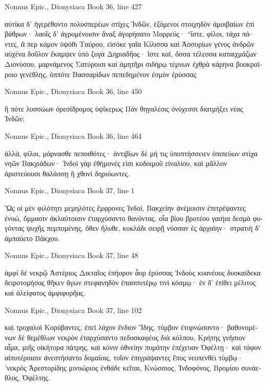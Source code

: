 \documentclass[12pt,letterpaper,twoside,final]{memoir}
\begin{document}
\begin{greek}
Nonnus Epic., Dionysiaca 
Book 36, line 427

αὐτίκα δ' ἠγερέθοντο πολυσπερέων στίχες Ἰνδῶν, 
ἑζόμενοι στοιχηδὸν ἀμοιβαίων ἐπὶ βάθρων· 
λαοῖς δ' ἀγρομένοισιν ἄναξ ἀγορήσατο Μορρεύς· 
 “ἴστε, φίλοι, τάχα πάντες, ἅ περ κάμον ὑψόθι Ταύρου, 
εἰσόκε γαῖα Κίλισσα καὶ Ἀσσυρίων γένος ἀνδρῶν 
αὐχένα δοῦλον ἔκαμψεν ὑπὸ ζυγὰ Δηριαδῆος· 
ἴστε καί, ὅσσα τέλεσσα καταιχμάζων Διονύσου, 
μαρνάμενος Σατύροισι καὶ ἀμητῆρι σιδήρῳ 
τέμνων ἐχθρὰ κάρηνα βοοκραίροιο γενέθλης, 
ὁππότε Βασσαρίδων πεπεδημένον ἐσμὸν ἐρύσσας 




Nonnus Epic., Dionysiaca 
Book 36, line 450

ἢ πότε λυσσώων ὀρεσίδρομος ὑψίκερως Πὰν 
θηγαλέοις ὀνύχεσσι διατμήξει νέας Ἰνδῶν; 



Nonnus Epic., Dionysiaca 
Book 36, line 464

ἀλλά, φίλοι, μάρνασθε πεποιθότες· ἀντιβίων δὲ 
μή τις ὑποπτήσσειεν ὀπιπεύων στίχα νηῶν 
Βακχιάδων· Ἰνδοὶ γὰρ ἐθήμονές εἰσι κυδοιμοῦ 
εἰναλίου, καὶ μᾶλλον ἀριστεύουσι θαλάσσῃ 
ἢ χθονὶ δηριόωντες. 



Nonnus Epic., Dionysiaca 
Book 37, line 1

Ὣς οἱ μὲν φιλότητι μεμηλότες ἔμφρονες Ἰνδοί, 
Βακχείην ἀνέμοισιν ἐπιτρέψαντες ἐνυώ, 
ὄμμασιν ἀκλαύτοισιν ἐταρχύσαντο θανόντας, 
οἷα βίου βροτέου γαιήια δεσμὰ φυγόντας 
ψυχῆς πεμπομένης, ὅθεν ἤλυθε, κυκλάδι σειρῇ 
νύσσαν ἐς ἀρχαίην· στρατιὴ δ' ἀμπαύετο Βάκχου. 



Nonnus Epic., Dionysiaca 
Book 37, line 48

                                          ἀμφὶ δὲ νεκρῷ 
Ἀστέριος Δικταῖος ἐπήορον ἆορ ἐρύσσας 
Ἰνδοὺς κυανέους δυοκαίδεκα δειροτομήσας 
θῆκεν ἄγων στεφανηδὸν ἐπασσυτέρῳ τινὶ κόσμῳ· 
ἐν δ' ἐτίθει μέλιτος καὶ ἀλείφατος ἀμφιφορῆας. 



Nonnus Epic., Dionysiaca 
Book 37, line 102

καὶ τροχαλοὶ Κορύβαντες, ἐπεὶ λάχον ἔνδιον Ἴδης, 
τύμβον ἐτορνώσαντο· βαθυνομένων δὲ θεμέθλων 
νεκρὸν ἐταρχύσαντο πεδοσκαφέος διὰ κόλπου, 
Κρήτης γνήσιον αἷμα, μιῆς οἰκήτορα πάτρης, 
καὶ κόνιν ὀθνείην πυμάτην ἐπέχευαν Ὀφέλτῃ· 
καὶ τάφον αἰπυτέροισιν ἀνεστήσαντο δομαίοις, 
τοῖον ἐπιγράψαντες ἔπος νεοπενθέι τύμβῳ· 
’νεκρὸς Ἀρεστορίδης μινυώριος ἐνθάδε κεῖται,   
Κνώσσιος, Ἰνδοφόνος, Βρομίου συνάεθλος, Ὀφέλτης. 




\end{greek}
\end{document}
